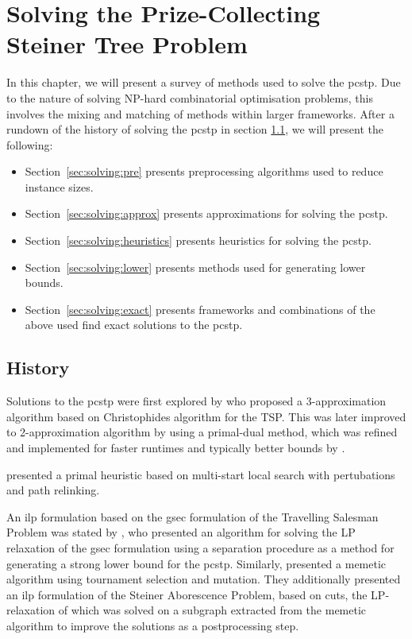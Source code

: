 \chapter{Solving the Prize-Collecting Steiner Tree Problem}
\label{chap:solving}

In this chapter, we will present a survey of methods used to solve the \gls{pcstp}. Due to the nature of solving
NP-hard combinatorial optimisation problems, this involves the mixing and matching of methods within larger frameworks.
 After a rundown of the history of solving the \gls{pcstp} in section \ref{sec:solving:history}, we will present the following:
\begin{itemize}
\item Section~\ref{sec:solving:pre} presents preprocessing algorithms used to reduce instance sizes.
\item Section~\ref{sec:solving:approx} presents approximations for solving the \gls{pcstp}.
\item Section~\ref{sec:solving:heuristics} presents heuristics for solving the \gls{pcstp}.
\item Section~\ref{sec:solving:lower} presents methods used for generating lower bounds.
\item Section~\ref{sec:solving:exact} presents frameworks and combinations of the above used find exact solutions
   to the \gls{pcstp}.
\end{itemize}

\section{History}
\label{sec:solving:history}

Solutions to the \gls{pcstp} were first explored by \citet{Bienstock1993} who
proposed a 3-approximation algorithm based on Christophides algorithm for the TSP.
This was later improved to 2-approximation algorithm by
\citet{goemans1997primal} using a primal-dual method,
which was refined and implemented
for faster runtimes and typically better
bounds by \citet{Johnson:2000:PCS:338219.338637}.

\citet{canuto2001local} presented a primal heuristic based on multi-start
local search with pertubations and path relinking.

An \gls{ilp} formulation based on the \gls{gsec} formulation of the Travelling Salesman Problem was
stated by \citet{lucena2004strong}, who presented an algorithm for solving the LP relaxation of the \gls{gsec} formulation using
a separation procedure as a method for generating a strong lower bound for the \gls{pcstp}. Similarly, \citet{Ljubic:2004:memetic}
presented a memetic algorithm using tournament selection and mutation. They additionally presented an \gls{ilp} formulation of the Steiner
 Aborescence Problem, based on cuts, the LP-relaxation of which was solved on a subgraph extracted from the memetic algorithm to
 improve the solutions as a postprocessing step.

